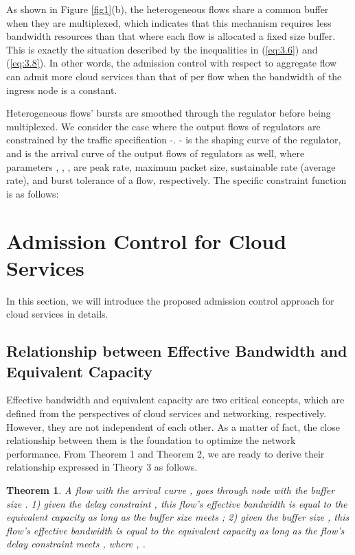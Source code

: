 \documentclass[a4paper]{article}
\newtheorem{theorem}{Theorem}
\begin{document}
As shown in Figure \ref{fig1}(b), the heterogeneous flows share a common buffer when they are multiplexed, which indicates that this mechanism requires less bandwidth resources than that where each flow is allocated a fixed size buffer. This is exactly the situation described by the inequalities in (\ref{eq:3.6}) and (\ref{eq:3.8}). In other words, the admission control with respect to aggregate flow can admit more cloud services than that of per flow when the bandwidth of the ingress node is a constant.

Heterogeneous flows’ bursts are smoothed through the regulator before being multiplexed. We consider the case where the output flows of regulators are constrained by the traffic specification -. - is the shaping curve of the regulator, and is the arrival curve of the output flows of regulators as well, where parameters , , ,  are peak rate, maximum packet size, sustainable rate (average rate), and burst tolerance of a flow, respectively. The specific constraint function is as follows:




\section{Admission Control for Cloud Services}

In this section, we will introduce the proposed admission control approach for cloud services in details.

\subsection{Relationship between Effective Bandwidth and Equivalent Capacity}

Effective bandwidth and equivalent capacity are two critical concepts, which are defined from the perspectives of cloud services and networking, respectively. However, they are not independent of each other. As a matter of fact, the close relationship between them is the foundation to optimize the network performance. From Theorem 1 and Theorem 2, we are ready to derive their relationship expressed in Theory 3 as follows.

\begin{theorem}
A flow with the arrival curve , goes through node  with the buffer size . 1)  given the delay constraint , this flow's effective bandwidth is equal to the equivalent capacity as long as the buffer size  meets ; 2) given the buffer size , this flow’s effective bandwidth is equal to the equivalent capacity as long as the flow’s delay constraint  meets , where , .
\end{theorem}
\end{document}
